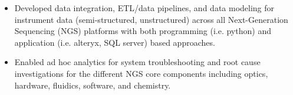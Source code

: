 \documentclass[10pt,a4paper]{altacv}
\begin{document}
\tagline{}

%

\begin{fullwidth}
\makecvheader
\end{fullwidth}

%





\begin{itemize}
    \item   \small{Developed data integration, ETL/data pipelines, and data modeling for instrument data (semi-structured, unstructured) across all Next-Generation Sequencing (NGS) platforms with both programming (i.e. python) and application (i.e. alteryx, SQL server) based approaches.}
    \item   \small{Enabled ad hoc analytics for system troubleshooting and root cause investigations for the different NGS core components including optics, hardware, fluidics, software, and chemistry.}
\end{itemize}

\medskip
\end{document}

